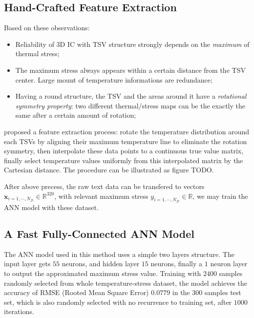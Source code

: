 \subsection{Hand-Crafted Feature Extraction} \label{sec::hc-fe}
Based on these observations:
\begin{itemize}
    \item Reliability of 3D IC with TSV structure strongly depends on 
          the \textit{maximum} of thermal stress;
    \item The maximum stress always appears within a certain distance from the TSV center.
          Large mount of temperature informations are redundance;
    \item Having a round structure,
          the TSV and the areas around it have a \textit{rotational symmetry
          property}: two different thermal/stress maps can be the exactly
          the same after a certain amount of rotation;
\end{itemize}
\cite{Zhang2016Fast} proposed a feature extraction process: rotate the temperature distribution
around each TSVs by aligning their maximum temperature line to eliminate the rotation symmetry,
then interpolate these data points to a continuous true value matrix, finally select temperature
values uniformly from this interpolated matrix by the Cartesian distance. The procedure can be
illustrated as figure TODO.

After above precess, the raw text data can be transfered to vectors 
$\mathbf{x}_{i=1,\cdots,N_\mathcal{D}} \in \mathbb{R}^{320}$, 
with relevant maximum stress 
$y_{i=1,\cdots,N_\mathcal{D}} \in \mathbb{R}$,
we may train the ANN model with these dataset.

\subsection{A Fast Fully-Connected ANN Model}
The ANN model used in this method uses a simple two layers structure. 
The input layer gets $55$ neurons, and hidden layer $15$ neurons, finally a $1$ neuron layer
to output the approximated maximum stress value.
Training with $2400$ samples randomly selected from whole temperature-stress dataset,
the model achieves the accuracy of RMSE (Rooted Mean Square Error) $0.0779$ in the $300$ samples test set,
which is also randomly selected with no recurrence to training set, after $1000$ iterations.

